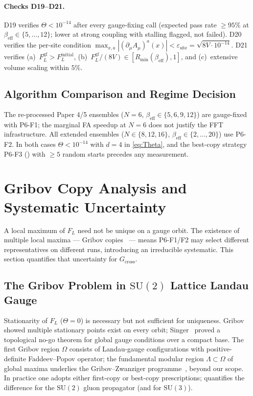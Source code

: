 \documentclass[11pt,a4paper]{article}
\theoremstyle{plain}
\theoremstyle{definition}
\theoremstyle{remark}
\newcommand{\SU}{\mathrm{SU}}
\newcommand{\Gcross}{G_{\mathrm{cross}}}
\newcommand{\be}{\beta_{\mathrm{eff}}}
\newcommand{\FL}{F_{L}}
\newcommand{\Lcond}{\partial_{\mu}A_{\mu}}
\begin{document}
\paragraph{Checks D19--D21.}
D19 verifies $\Theta<10^{-14}$ after every gauge-fixing call (expected
pass rate $\ge95\%$ at $\be\in\{5,\ldots,12\}$; lower at strong coupling
with stalling flagged, not failed). D20 verifies the per-site condition
$\max_{x,a}|(\Lcond)^a(x)|<\varepsilon_{\mathrm{site}}=\sqrt{8V\cdot10^{-14}}$.
D21 verifies (a)~$\FL^{\mathrm{gf}}>\FL^{\mathrm{initial}}$,
(b)~$\FL^{\mathrm{gf}}/(8V)\in[R_{\min}(\be),1]$, and
(c)~extensive volume scaling within $5\%$.

\subsection{Algorithm Comparison and Regime Decision}
\label{ssec:regime}

The re-processed Paper 4/5 ensembles ($N=6$, $\be\in\{5,6,9,12\}$) are
gauge-fixed with P6-F1; the marginal FA speedup at $N=6$ does not justify
the FFT infrastructure. All extended ensembles ($N\in\{8,12,16\}$,
$\be\in\{2,\ldots,20\}$) use P6-F2. In both cases $\Theta<10^{-14}$ with
$d=4$ in \eqref{eq:Theta}, and the best-copy strategy P6-F3
() with $\ge5$ random starts precedes any measurement.

\section{Gribov Copy Analysis and Systematic Uncertainty}
\label{sec:gribov}

A local maximum of $\FL$ need not be unique on a gauge orbit. The
existence of multiple local maxima --- Gribov copies~\cite{Gri,Zwa} ---
means P6-F1/F2 may select different representatives on different runs,
introducing an irreducible systematic. This section quantifies that
uncertainty for $\Gcross$.

\subsection{The Gribov Problem in $\SU(2)$ Lattice Landau Gauge}
\label{ssec:gribovproblem}

Stationarity of $\FL$ ($\Theta=0$) is necessary but not sufficient for
uniqueness. Gribov~\cite{Gri} showed multiple stationary points exist on
every orbit; Singer~\cite{Singer} proved a topological no-go theorem for
global gauge conditions over a compact base. The first Gribov region
$\Omega$ consists of Landau-gauge configurations with positive-definite
Faddeev--Popov operator; the fundamental modular region
$\Lambda\subset\Omega$ of global maxima underlies the
Gribov--Zwanziger programme~\cite{Zwa}, beyond our scope. In practice
one adopts either first-copy or best-copy prescriptions;
\cite{CM} quantifies the difference for the $\SU(2)$ gluon propagator
(and \cite{Bo} for $\SU(3)$).
\end{document}

